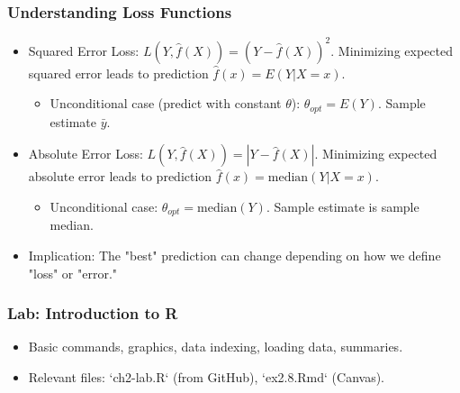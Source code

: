 \documentclass[12pt,a4paper]{article}
\begin{document}
    \subsubsection{Understanding Loss Functions }
        \begin{itemize}
            \item Squared Error Loss: $L(Y, \hat{f}(X)) = (Y - \hat{f}(X))^2$. Minimizing expected squared error leads to prediction $\hat{f}(x) = E(Y|X=x)$.
                \begin{itemize}
                    \item Unconditional case (predict with constant $\theta$): $\theta_{opt} = E(Y)$. Sample estimate $\bar{y}$.
                \end{itemize}
            \item Absolute Error Loss: $L(Y, \hat{f}(X)) = |Y - \hat{f}(X)|$. Minimizing expected absolute error leads to prediction $\hat{f}(x) = \text{median}(Y|X=x)$.
                \begin{itemize}
                    \item Unconditional case: $\theta_{opt} = \text{median}(Y)$. Sample estimate is sample median.
                \end{itemize}
            \item Implication: The "best" prediction can change depending on how we define "loss" or "error."
        \end{itemize}

    \subsubsection{Lab: Introduction to R }
        \begin{itemize}
            \item Basic commands, graphics, data indexing, loading data, summaries.
            \item Relevant files: `ch2-lab.R` (from GitHub), `ex2.8.Rmd` (Canvas).
        \end{itemize}
\end{document}
